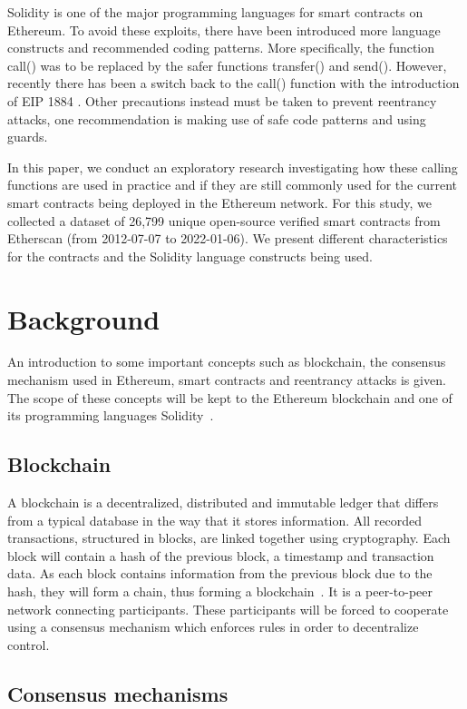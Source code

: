 \documentclass[10pt,conference]{IEEEtran}
\newcommand{\totalContracts}{26,799\xspace}
\begin{document}
Solidity is one of the major programming languages for smart contracts on Ethereum. To avoid these exploits, there have been introduced more language constructs and recommended coding patterns. More specifically, the function call() was to be replaced by the safer functions transfer() and send(). However, recently there has been a switch back to the call() function with the introduction of EIP 1884 \cite{eip1884}. Other precautions instead must be taken to prevent reentrancy attacks, one recommendation is making use of safe code patterns and using guards.

In this paper, we conduct an exploratory research investigating how these calling functions are used in practice and if they are still commonly used for the current smart contracts being deployed in the Ethereum network. For this study, we collected a dataset of \totalContracts unique open-source verified smart contracts from Etherscan (from 2012-07-07 to 2022-01-06). We present different characteristics for the contracts and the Solidity language constructs being used.


\section{Background}
An introduction to some important concepts such as blockchain, the consensus mechanism used in Ethereum, smart contracts and reentrancy attacks is given. The scope of these concepts will be kept to the Ethereum blockchain and one of its programming languages Solidity~\cite{solidity}.

\subsection{Blockchain}
A blockchain is a decentralized, distributed and immutable ledger that differs from a typical database in the way that it stores information. All recorded transactions, structured in blocks, are linked together using cryptography. Each block will contain a hash of the previous block, a timestamp and transaction data. As each block contains information from the previous block due to the hash, they will form a chain, thus forming a blockchain~\cite{article}. It is a peer-to-peer network connecting participants. These participants will be forced to cooperate using a consensus mechanism which enforces rules in order to decentralize control.

\subsection{Consensus mechanisms}
\end{document}

